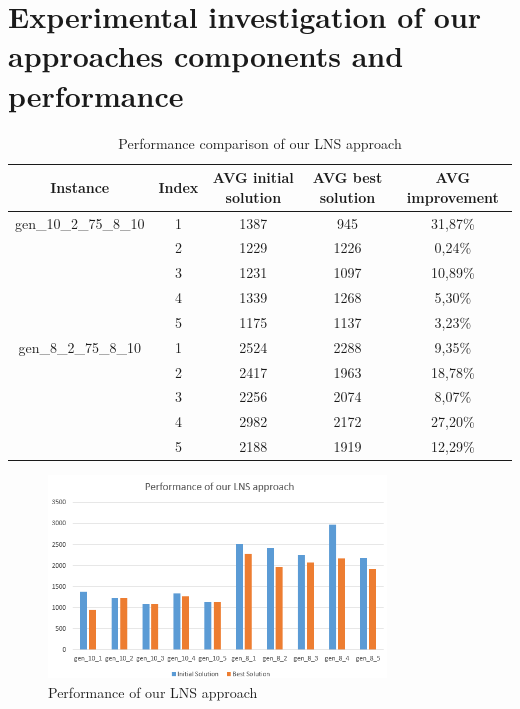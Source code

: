 \documentclass[fleqn]{scrartcl}
\begin{document}
\newpage
\section{Experimental investigation of our approaches components and performance}
\begin{table}[H]
\begin{tabular}{|c|c|c|c|c|}
\hline 
Instance & Index & AVG initial solution & AVG best solution & AVG improvement \\ 
\hline 
gen\_10\_2\_75\_8\_10 & 1 & 1387 & 945 & 31,87\% \\ 
\hline 
& 2 & 1229 & 1226 & 0,24\% \\ 
\hline 
& 3 & 1231 & 1097 & 10,89\% \\ 
\hline 
& 4 & 1339 & 1268 & 5,30\% \\ 
\hline 
& 5 & 1175 & 1137 & 3,23\% \\ 
\hline 
gen\_8\_2\_75\_8\_10 & 1 & 2524 & 2288 & 9,35\% \\ 
\hline 
& 2 & 2417 & 1963 & 18,78\% \\ 
\hline 
& 3 & 2256 & 2074 & 8,07\% \\ 
\hline 
& 4 & 2982 & 2172 & 27,20\% \\ 
\hline 
& 5 & 2188 & 1919 & 12,29\% \\ 
\hline 
\end{tabular}
\caption{Performance comparison of our LNS approach}
\label{tab:performance}
\end{table}

\begin{figure}[htbp] 
\centering
\includegraphics[width=0.8\textwidth]{files/performance_lns.png}
\caption{Performance of our LNS approach}
\label{fig:performance}
\end{figure}

\newpage
\end{document}
